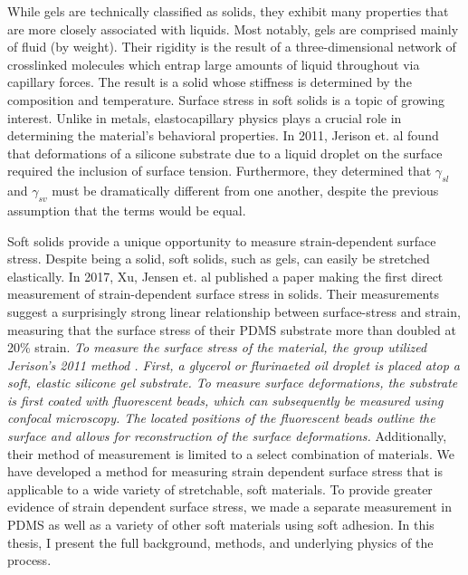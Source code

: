 While gels are technically classified as solids, they exhibit many properties that are more closely associated with liquids. Most notably, gels are comprised mainly of fluid (by weight). Their rigidity is the result of a three-dimensional network of crosslinked molecules which entrap large amounts of liquid throughout via capillary forces. The result is a solid whose stiffness is determined by the composition and temperature. Surface stress in soft solids is a topic of growing interest. Unlike in metals, elastocapillary physics plays a crucial role in determining the material's behavioral properties. In 2011, Jerison et. al \cite{jerison2011deformation} found that deformations of a silicone substrate due to a liquid droplet on the surface required the inclusion of surface tension. Furthermore, they determined that $\gamma_{sl}$ and $\gamma_{sv}$ must be dramatically different from one another, despite the previous assumption that the terms would be equal.

Soft solids provide a unique opportunity to measure strain-dependent surface stress. Despite being a solid, soft solids, such as gels, can easily be stretched elastically. In 2017, Xu, Jensen et. al published a paper \cite{xu2017direct} making the first direct measurement of strain-dependent surface stress in solids. Their measurements suggest a surprisingly strong linear relationship between surface-stress and strain, measuring that the surface stress of their PDMS substrate more than doubled at 20\% strain. \emph{To measure the surface stress of the material, the group utilized Jerison's 2011 method \cite{jerison2011deformation}. First, a glycerol or flurinaeted oil droplet is placed atop a soft, elastic silicone gel substrate. To measure surface deformations, the substrate is first coated with fluorescent beads, which can subsequently be measured using confocal microscopy. The located positions of the fluorescent beads outline the surface and allows for reconstruction of the surface deformations.} Additionally, their method of measurement is limited to a select combination of materials. We have developed a method for measuring strain dependent surface stress that is applicable to a wide variety of stretchable, soft materials. To provide greater evidence of strain dependent surface stress, we made a separate measurement in PDMS as well as a variety of other soft materials using soft adhesion. In this thesis, I present the full background, methods, and underlying physics of the process.    


